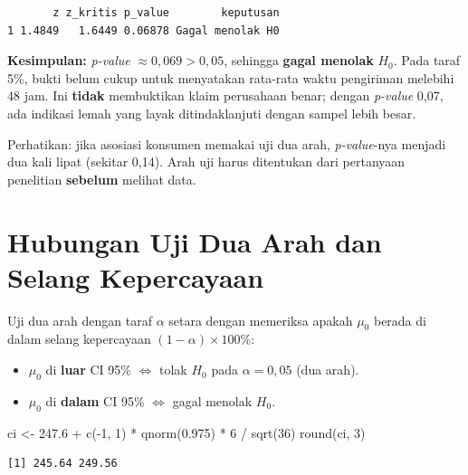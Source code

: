\documentclass[
  indonesian,
  letterpaper,
]{book}
\newenvironment{Shaded}{\begin{snugshade}}{\end{snugshade}}
\newcommand{\DecValTok}[1]{\textcolor[rgb]{0.68,0.00,0.00}{#1}}
\newcommand{\FloatTok}[1]{\textcolor[rgb]{0.68,0.00,0.00}{#1}}
\newcommand{\FunctionTok}[1]{\textcolor[rgb]{0.28,0.35,0.67}{#1}}
\newcommand{\NormalTok}[1]{\textcolor[rgb]{0.00,0.23,0.31}{#1}}
\newcommand{\OtherTok}[1]{\textcolor[rgb]{0.00,0.23,0.31}{#1}}
\newcommand{\SpecialCharTok}[1]{\textcolor[rgb]{0.37,0.37,0.37}{#1}}
\providecommand{\tightlist}{%
  \setlength{\itemsep}{0pt}\setlength{\parskip}{0pt}}
\begin{document}
\begin{verbatim}
       z z_kritis p_value        keputusan
1 1.4849   1.6449 0.06878 Gagal menolak H0
\end{verbatim}

\textbf{Kesimpulan:} \emph{p-value} \(\approx 0{,}069 > 0{,}05\),
sehingga \textbf{gagal menolak} \(H_0\). Pada taraf 5\%, bukti belum
cukup untuk menyatakan rata-rata waktu pengiriman melebihi 48 jam. Ini
\textbf{tidak} membuktikan klaim perusahaan benar; dengan \emph{p-value}
0,07, ada indikasi lemah yang layak ditindaklanjuti dengan sampel lebih
besar.

Perhatikan: jika asosiasi konsumen memakai uji dua arah,
\emph{p-value}-nya menjadi dua kali lipat (sekitar 0,14). Arah uji harus
ditentukan dari pertanyaan penelitian \textbf{sebelum} melihat data.

\section{Hubungan Uji Dua Arah dan Selang
Kepercayaan}\label{hubungan-uji-dua-arah-dan-selang-kepercayaan}

Uji dua arah dengan taraf \(\alpha\) setara dengan memeriksa apakah
\(\mu_0\) berada di dalam selang kepercayaan
\((1-\alpha) \times 100\%\):

\begin{itemize}
\tightlist
\item
  \(\mu_0\) di \textbf{luar} CI 95\% \(\Longleftrightarrow\) tolak
  \(H_0\) pada \(\alpha = 0{,}05\) (dua arah).
\item
  \(\mu_0\) di \textbf{dalam} CI 95\% \(\Longleftrightarrow\) gagal
  menolak \(H_0\).
\end{itemize}

\begin{Shaded}
\begin{Highlighting}[]
\NormalTok{ci }\OtherTok{\textless{}{-}} \FloatTok{247.6} \SpecialCharTok{+} \FunctionTok{c}\NormalTok{(}\SpecialCharTok{{-}}\DecValTok{1}\NormalTok{, }\DecValTok{1}\NormalTok{) }\SpecialCharTok{*} \FunctionTok{qnorm}\NormalTok{(}\FloatTok{0.975}\NormalTok{) }\SpecialCharTok{*} \DecValTok{6} \SpecialCharTok{/} \FunctionTok{sqrt}\NormalTok{(}\DecValTok{36}\NormalTok{)}
\FunctionTok{round}\NormalTok{(ci, }\DecValTok{3}\NormalTok{)}
\end{Highlighting}
\end{Shaded}

\begin{verbatim}
[1] 245.64 249.56
\end{verbatim}
\end{document}

